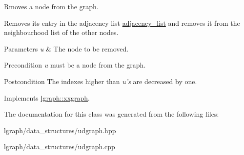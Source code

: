 Rmoves a node from the graph. 

Removes its entry in the adjacency list \hyperlink{classlgraph_1_1xxgraph_a31cf82d0b20be05290be259dc97a51ec}{adjacency\-\_\-list} and removes it from the neighbourhood list of the other nodes.


\begin{DoxyParams}{Parameters}
{\em u} & The node to be removed. \\
\hline
\end{DoxyParams}
\begin{DoxyPrecond}{Precondition}
{\itshape u} must be a node from the graph. 
\end{DoxyPrecond}
\begin{DoxyPostcond}{Postcondition}
The indexes higher than {\itshape u's} are decreased by one. 
\end{DoxyPostcond}


Implements \hyperlink{classlgraph_1_1xxgraph_a5b9e033f38a3ab34734be61aa9344c84}{lgraph\-::xxgraph}.



The documentation for this class was generated from the following files\-:\begin{DoxyCompactItemize}
\item 
lgraph/data\-\_\-structures/udgraph.\-hpp\item 
lgraph/data\-\_\-structures/udgraph.\-cpp\end{DoxyCompactItemize}
